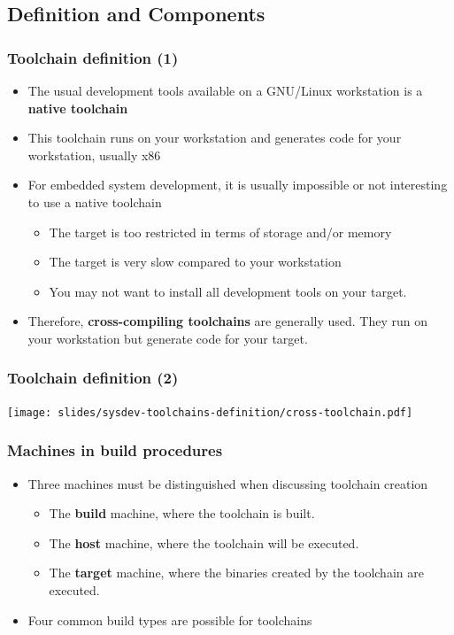 \subsection{Definition and Components}

\begin{frame}
  \frametitle{Toolchain definition (1)}
  \begin{itemize}
  \item The usual development tools available on a GNU/Linux
    workstation is a {\bf native toolchain}
  \item This toolchain runs on your workstation and generates code for
    your workstation, usually x86
  \item For embedded system development, it is usually impossible or not
    interesting to use a native toolchain
    \begin{itemize}
    \item The target is too restricted in terms of storage and/or memory
    \item The target is very slow compared to your workstation
    \item You may not want to install all development tools on your target.
    \end{itemize}
  \item Therefore, {\bf cross-compiling toolchains} are generally
    used. They run on your workstation but generate code for your
    target.
  \end{itemize}
\end{frame}

\begin{frame}
  \frametitle{Toolchain definition (2)}
  \begin{center}
    \texttt{[image: slides/sysdev-toolchains-definition/cross-toolchain.pdf]}
  \end{center}
\end{frame}

\begin{frame}
  \frametitle{Machines in build procedures}
  \begin{itemize}
  \item Three machines must be distinguished when discussing toolchain creation
    \begin{itemize}
    \item The {\bf build} machine, where the toolchain is built.
    \item The {\bf host} machine, where the toolchain will be executed.
    \item The {\bf target} machine, where the binaries created by the
      toolchain are executed.
    \end{itemize}
  \item Four common build types are possible for toolchains
  \end{itemize}
\end{frame}

